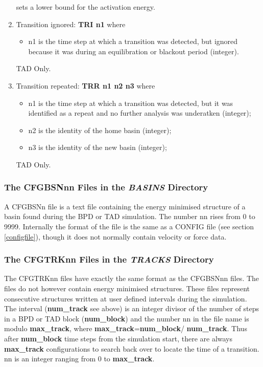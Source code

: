 \begin{enumerate}
sets a lower bound for the activation energy.
\item Transition ignored: {\bf TRI n1} \newline
where
\begin{itemize}
\item n1 is the time step at which a transition was detected, but
ignored because it was during an equilibration or blackout period
(integer). 
\end{itemize}
TAD Only.
\item Transition repeated: {\bf TRR n1 n2 n3} \newline
where
\begin{itemize}
\item n1 is the time step at which a transition was detected, but
it was identified as a repeat and no further analysis was underatken
(integer);
\item n2 is the identity of the home basin (integer);
\item n3 is the identity of the new basin (integer);
\end{itemize}
TAD Only.
\end{enumerate}

\subsubsection{The CFGBSNnn Files in the {\em BASINS} Directory}
\label{cfgbsn}

A CFGBSNn file is a text file containing the energy minimised
structure of a basin found during the BPD or TAD
simulation. The number nn rises from 0 to 9999. Internally the format
of the file is the same as a CONFIG file (see section
\ref{configfile}), though it does not normally contain velocity or 
force data.

\subsubsection{The CFGTRKnn Files in the {\em TRACKS} Directory}

The CFGTRKnn files have exactly the same format as the CFGBSNnn
files. The files do not however contain energy minimised structures.
These files represent consecutive structures written at user defined
intervals during the simulation. The interval ({\bf num\_track} see
above) is an integer divisor of the number of steps in a BPD or TAD
block ({\bf num\_block}) and the number nn in the file name is modulo
{\bf max\_track}, where {\bf max\_track}={\bf num\_block}/{\bf
num\_track}. Thus after {\bf num\_block} time steps from the
simulation start, there are always {\bf max\_track} configurations to
search back over to locate the time of a transition. nn is an integer
ranging from 0 to {\bf max\_track}.


